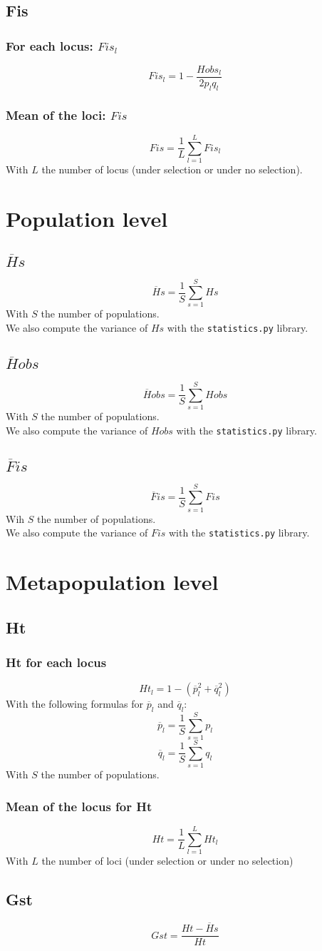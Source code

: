 \documentclass[10pt,a4paper]{article}
\begin{document}
\subsection{Fis}
\subsubsection{For each locus: $Fis_l$}
\[ Fis_l = 1- \frac{Hobs_l}{2p_l q_l}\]
\subsubsection{Mean of the loci: $Fis$}
\[Fis = \frac{1}{L}\sum_{l=1}^L Fis_l\]
With $L$ the number of locus (under selection or under no selection).


\section{Population level}
\subsection{$\overline{H}s$}
\[ \overline{H}s = \frac{1}{S}\sum_{s=1}^S Hs\]
With $S$ the number of populations.\\
We also compute the variance of $Hs$ with the \texttt{statistics.py} library.
\subsection{$\overline{H}obs$}
\[ \overline{H}obs = \frac{1}{S}\sum_{s=1}^S Hobs \]
With $S$ the number of populations.\\
We also compute the variance of $Hobs$ with the \texttt{statistics.py} library.
\subsection{$\overline{F}is$}
\[ \overline{F}is = \frac{1}{S}\sum_{s=1}^S Fis \]
Wih $S$ the number of populations.\\
We also compute the variance of $Fis$ with the \texttt{statistics.py} library.

\section{Metapopulation level}
\subsection{Ht}
\subsubsection{Ht for each locus}
\[ Ht_l = 1-(\overline{p}_l^2 + \overline{q}_l^2) \]
With the following formulas for $\overline{p}_l$ and $\overline{q}_l$:
\[ \overline{p}_l = \frac{1}{S}\sum_{s=1}^{S} p_l \]
\[ \overline{q}_l = \frac{1}{S}\sum_{s=1}^{S} q_l \]
With $S$ the number of populations.
\subsubsection{Mean of the locus for Ht}
\[ Ht = \frac{1}{L}\sum_{l=1}^{L} Ht_l\]
With $L$ the number of loci (under selection or under no selection)
\subsection{Gst}
\[ Gst = \frac{Ht - \overline{H}s}{Ht} \]
\end{document}
